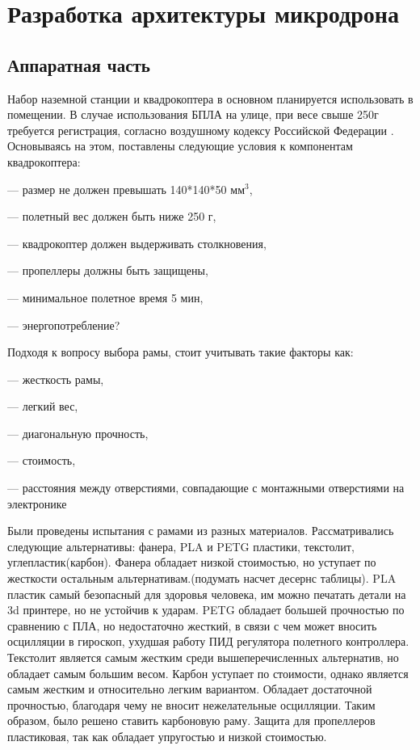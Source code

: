 
\section{Разработка архитектуры микродрона}
\subsection{Аппаратная часть}

Набор наземной станции и квадрокоптера в основном планируется использовать в помещении. В случае использования БПЛА на улице, при весе свыше 250г требуется регистрация, согласно воздушному кодексу Российской Федерации\cite{ivp} . Основываясь на этом, поставлены следующие условия к компонентам квадрокоптера:

--- размер не должен превышать 140*140*50 \(мм^3\),

--- полетный вес должен быть ниже 250 г,

--- квадрокоптер должен выдерживать столкновения,

--- пропеллеры должны быть защищены,

--- минимальное полетное время 5 мин,

--- энергопотребление?

Подходя к вопросу выбора рамы, стоит учитывать такие факторы как:

--- жесткость рамы,

--- легкий вес,

--- диагональную прочность,

--- стоимость,

--- расстояния между отверстиями, совпадающие с монтажными отверстиями на электронике

Были проведены испытания с рамами из разных материалов. Рассматривались следующие альтернативы: фанера, PLA и PETG пластики, текстолит, углепластик(карбон). Фанера обладает низкой стоимостью, но уступает по жесткости остальным альтернативам.(подумать насчет десернс таблицы). PLA пластик самый безопасный для здоровья человека, им можно печатать детали на 3d принтере, но не устойчив к ударам. PETG обладает большей прочностью по сравнению с ПЛА, но недостаточно жесткий, в связи с чем может вносить осцилляции в гироскоп, ухудшая работу ПИД регулятора полетного контроллера. Текстолит является самым жестким среди вышеперечисленных альтернатив, но обладает самым большим весом. Карбон уступает по стоимости, однако является самым жестким и относительно легким вариантом. Обладает достаточной прочностью, благодаря чему не вносит нежелательные осцилляции. Таким образом, было решено ставить карбоновую раму.
Защита для пропеллеров пластиковая, так как обладает упругостью и низкой стоимостью.

